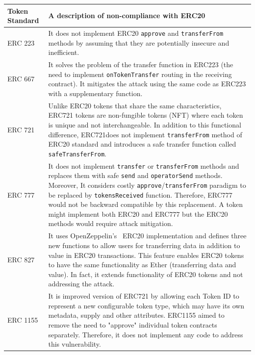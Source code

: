 \begin{table}
\centering
\def\arraystretch{1.5}%
\begin{tabular}{|m{1.8cm}|m{14.5cm}|}
	\hline\centering
	\textbf{Token Standard} & \textbf{A description of non-compliance with ERC20}\\
	\hline\hline\centering
	ERC 223 \cite{Ref20} & It does not implement ERC20 \texttt{approve} and \texttt{transferFrom} methods by assuming that they are potentially insecure and inefficient.\\ 
	\hline\centering 
	ERC 667 \cite{Ref21} & It solves the problem of the transfer function in ERC223 (\ie the need to implement \texttt{onTokenTransfer} routing in the receiving contract). It mitigates the attack using the same code as ERC223 with a supplementary function.\\ 
	\hline\centering 
	ERC 721 \cite{Ref22} & Unlike ERC20 tokens that share the same characteristics, ERC721 tokens are non-fungible tokens (NFT) where each token is unique and not interchangeable. In addition to this functional difference, ERC721does not implement \texttt{transferFrom} method of ERC20 standard and introduces a safe transfer function called \texttt{safeTransferFrom}.\\ 
	\hline\centering
	ERC 777 \cite{Ref23} & It does not implement \texttt{transfer} or \texttt{transferFrom} methods and replaces them with safe \texttt{send} and \texttt{operatorSend} methods. Moreover, It considers costly \texttt{approve}/\texttt{transferFrom} paradigm to be replaced by \texttt{tokensReceived} function. Therefore, ERC777 would not be backward compatible by this replacement. A token might implement both ERC20 and ERC777 but the ERC20 methods would require attack mitigation.\\ 
	\hline\centering 
	ERC 827 \cite{Ref24} & It uses OpenZeppelin's~\cite{Ref10} ERC20 implementation and defines three new functions to allow users for transferring data in addition to value in ERC20 transactions. This feature enables ERC20 tokens to have the same functionality as Ether (transferring data and value). In fact, it extends functionality of ERC20 tokens and not addressing the attack. \\ 
	\hline\centering 
	ERC 1155 \cite{Ref25} & It is improved version of ERC721 by allowing each Token ID to represent a new configurable token type, which may have its own metadata, supply and other attributes. ERC1155 aimed to remove the need to "approve" individual token contracts separately. Therefore, it does not implement any code to address this vulnerability.\\ 

\end{tabular}
\end{table}
